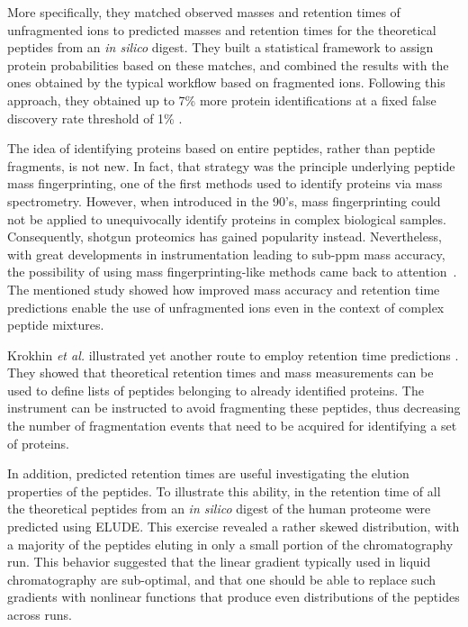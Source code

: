 \documentclass[a4paper]{article}
\begin{document}
More specifically, they matched observed masses and retention times of
unfragmented ions to predicted masses and retention times for the
theoretical peptides from an {\it in silico} digest. They built a
statistical framework to assign protein probabilities based on these
matches, and combined the results with the ones obtained by the
typical workflow based on fragmented ions. Following this approach, they
obtained up to 7\% more protein identifications at a fixed false
discovery rate threshold of 1\% \cite{mf}.

The idea of identifying proteins based on entire peptides, rather than
peptide fragments, is not new. In fact, that strategy was the
principle underlying peptide mass fingerprinting, one of the first
methods used to identify proteins via mass spectrometry. However, when
introduced in the 90's, mass fingerprinting could not be applied to
unequivocally identify proteins in complex biological
samples. Consequently, shotgun proteomics has gained popularity
instead. Nevertheless, with great developments in instrumentation
leading to sub-ppm mass accuracy, the possibility of using mass
fingerprinting-like methods came back to attention~\cite{iamt1}. The
mentioned study showed how improved mass accuracy and retention time
predictions enable the use of unfragmented ions even in the context of
complex peptide mixtures.

Krokhin {\em et al.} illustrated yet another route to employ retention time
predictions \cite{krokhin200612, McQueen2012}. They showed that
theoretical retention times and mass measurements can be used to
define lists of peptides belonging to already identified proteins. The
instrument can be instructed to avoid fragmenting these peptides, thus
decreasing the number of fragmentation events that need to be acquired
for identifying a set of proteins.

In addition, predicted retention times are useful investigating the
elution properties of the peptides.  To illustrate this ability, in
\cite{elude1} the retention time of all the theoretical peptides from
an {\it in silico} digest of the human proteome were predicted using
{\sc ELUDE}. This exercise revealed a rather skewed distribution, with
a majority of the peptides eluting in only a small portion of the
chromatography run. This behavior suggested that the linear gradient
typically used in liquid chromatography are sub-optimal, and that one
should be able to replace such gradients with nonlinear functions that
produce even distributions of the peptides across runs.
\end{document}
